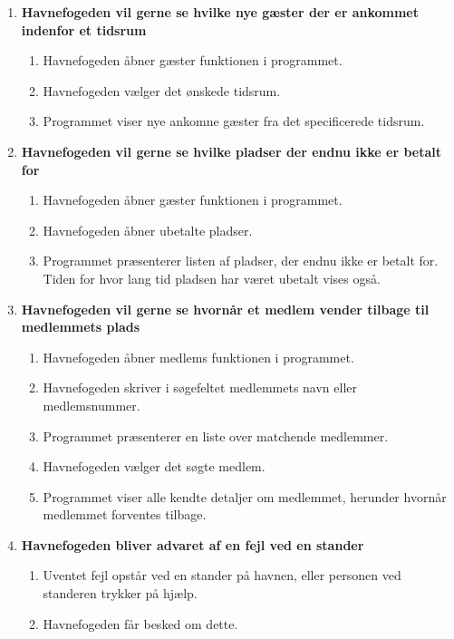 \begin{enumerate}
    \item{\bf{Havnefogeden vil gerne se hvilke nye gæster der er ankommet indenfor et tidsrum}}
      \begin{enumerate}
        \item Havnefogeden åbner gæster funktionen i programmet.
        \item Havnefogeden vælger det ønskede tidsrum.
        \item Programmet viser nye ankomne gæster fra det specificerede tidsrum.
      \end{enumerate}

    \item{\bf{Havnefogeden vil gerne se hvilke pladser der endnu ikke er betalt for}}
      \begin{enumerate}
        \item Havnefogeden åbner gæster funktionen i programmet.
        \item Havnefogeden åbner ubetalte pladser.
        \item Programmet præsenterer listen af pladser, der endnu ikke er betalt for. Tiden for hvor lang tid pladsen har været ubetalt vises også.
      \end{enumerate}

    \item{\bf{Havnefogeden vil gerne se hvornår et medlem vender tilbage til medlemmets plads}}
      \begin{enumerate}
        \item Havnefogeden åbner medlems funktionen i programmet.
        \item Havnefogeden skriver i søgefeltet medlemmets navn eller medlemsnummer.
        \item Programmet præsenterer en liste over matchende medlemmer.
        \item Havnefogeden vælger det søgte medlem.
        \item Programmet viser alle kendte detaljer om medlemmet, herunder hvornår medlemmet forventes tilbage.
      \end{enumerate}

    \item{\bf{Havnefogeden bliver advaret af en fejl ved en stander}}
      \begin{enumerate}
        \item Uventet fejl opstår ved en stander på havnen, eller personen ved standeren trykker på hjælp.
        \item Havnefogeden får besked om dette.
      \end{enumerate}


\end{enumerate}

